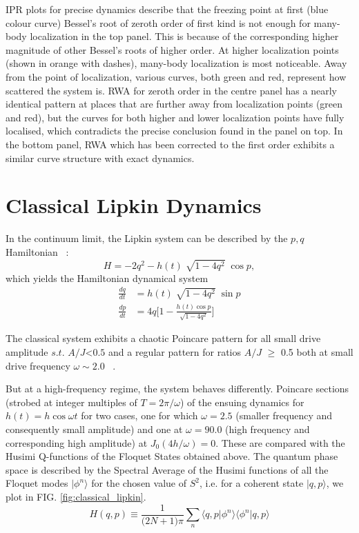 \documentclass[%
 reprint,
 amsmath,amssymb,
 aps,
]{revtex4-2}
\begin{document}
IPR plots for precise dynamics describe that the freezing point at first (blue colour curve) Bessel's root of zeroth order of first kind is not enough for many-body localization in the top panel. This is because of the corresponding higher magnitude of other Bessel's roots of higher order. At higher localization points (shown in orange with dashes), many-body localization is most noticeable. Away from the point of localization, various curves, both green and red, represent how scattered the system is.	RWA for zeroth order in the centre panel has a nearly identical pattern at places that are further away from localization points (green and red), but the curves for both higher and lower localization points have fully localised, which contradicts the precise conclusion found in the panel on top. In the bottom panel, RWA which has been corrected to the first order exhibits a similar curve structure with exact dynamics.

\section{\label{sec:level4}Classical Lipkin Dynamics}
In the continuum limit, the Lipkin system can be described by the $p,q$ Hamiltonian ~\cite{sciolla_quantum_2010}:
\begin{equation}
	H = -2 q^2 - h(t)\;\sqrt{1-4q^2}\;\cos{p},
\end{equation}
which yields the Hamiltonian dynamical system 
\begin{align}
	\frac{dq}{dt} &= h(t)\;\sqrt{1-4q^2}\;\sin{p}\nonumber \\
	\frac{dp}{dt} &= 4q\bigg[1-\frac{h(t)\cos{p}}{\sqrt{1-4q^2}}\bigg]
\end{align}

The classical system exhibits a chaotic Poincare pattern  for all small drive amplitude $s.t.$  $A/J $<$ 0.5 $ and a regular pattern for ratios $A/J$ $\geq$ 0.5 both at small drive frequency $\omega \sim 2.0$ ~\cite{russomanno_thermalization_2015}. 

But at a high-frequency regime, the system behaves differently. Poincare sections (strobed at integer multiples of $T=2\pi/\omega$) of the ensuing dynamics for $h(t)=h\cos{\omega t}$ for two cases, one for which $\omega=2.5$ (smaller frequency and consequently small amplitude) and one at $\omega=90.0$ (high frequency and corresponding high amplitude) at $J_0(4h/\omega)=0$. These are compared with the Husimi Q-functions of the Floquet States obtained above. The quantum phase space is described by the Spectral Average of the Husimi functions of all the Floquet modes $|\phi^n\rangle$ for the chosen value of $S^2$, i.e. for a coherent state $|q, p\rangle$, we plot in FIG. \ref{fig:classical_lipkin}.
\begin{equation*}
	H(q,p)\equiv \frac{1}{\big(2N+1\big)\pi}\sum_n \langle q,p\vert \phi^n\rangle\langle\phi^n\vert q,p\rangle
\end{equation*}
\end{document}

